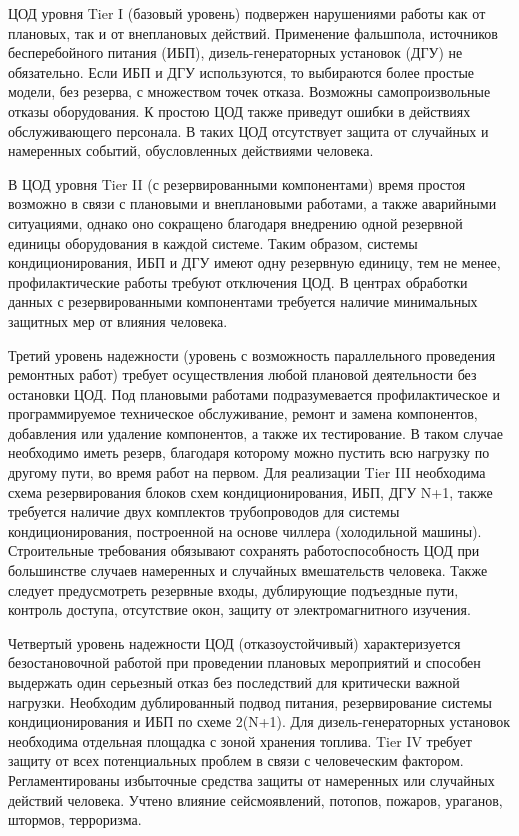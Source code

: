 ЦОД уровня Tier I (базовый уровень) подвержен нарушениями работы как от плановых, так и от внеплановых действий.
Применение фальшпола, источников бесперебойного питания (ИБП), дизель-генераторных установок (ДГУ) не обязательно.
Если ИБП и ДГУ используются, то выбираются более простые модели, без резерва, с множеством точек отказа.
Возможны самопроизвольные отказы оборудования.
К простою ЦОД также приведут ошибки в действиях обслуживающего персонала.
В таких ЦОД отсутствует защита от случайных и намеренных событий, обусловленных действиями человека.

В ЦОД уровня Tier II (с резервированными компонентами) время простоя возможно в связи с плановыми и внеплановыми работами, а также аварийными ситуациями, однако оно сокращено благодаря внедрению одной резервной единицы оборудования в каждой системе.
Таким образом, системы кондиционирования, ИБП и ДГУ имеют одну резервную единицу, тем не менее, профилактические работы требуют отключения ЦОД.
В центрах обработки данных с резервированными компонентами требуется наличие минимальных защитных мер от влияния человека.

Третий уровень надежности (уровень с возможность параллельного проведения ремонтных работ) требует осуществления любой плановой деятельности без остановки ЦОД.
Под плановыми работами подразумевается профилактическое и программируемое техническое обслуживание, ремонт и замена компонентов, добавления или удаление компонентов, а также их тестирование.
В таком случае необходимо иметь резерв, благодаря которому можно пустить всю нагрузку по другому пути, во время работ на первом.
Для реализации Tier III необходима схема резервирования блоков схем кондиционирования, ИБП, ДГУ N+1, также требуется наличие двух комплектов трубопроводов для системы кондиционирования, построенной на основе чиллера (холодильной машины).
Строительные требования обязывают сохранять работоспособность ЦОД при большинстве случаев намеренных и случайных вмешательств человека.
Также следует предусмотреть резервные входы, дублирующие подъездные пути, контроль доступа, отсутствие окон, защиту от электромагнитного изучения.

Четвертый уровень надежности ЦОД (отказоустойчивый) характеризуется безостановочной работой при проведении плановых мероприятий и способен выдержать один серьезный отказ без последствий для критически важной нагрузки.
Необходим дублированный подвод питания, резервирование системы кондиционирования и ИБП по схеме 2(N+1).
Для дизель-генераторных установок необходима отдельная площадка с зоной хранения топлива.
Tier IV требует защиту от всех потенциальных проблем в связи с человеческим фактором.
Регламентированы избыточные средства защиты от намеренных или случайных действий человека.
Учтено влияние сейсмоявлений, потопов, пожаров, ураганов, штормов, терроризма.

